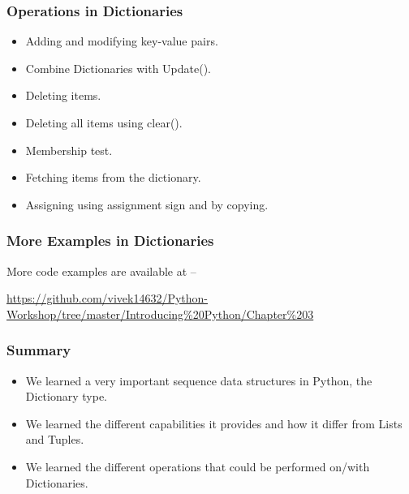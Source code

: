 \documentclass{beamer}
\begin{document}
\begin{frame}
\frametitle{Operations in Dictionaries}
\begin{itemize}
\item Adding and modifying key-value pairs.
\item Combine Dictionaries with Update().
\item Deleting items.
\item Deleting all items using clear().
\item Membership test.
\item Fetching items from the dictionary.
\item Assigning using assignment sign and by copying.
\end{itemize}
\end{frame}

\begin{frame}
\frametitle{More Examples in Dictionaries}
More code examples are available at --
 
\url{https://github.com/vivek14632/Python-Workshop/tree/master/Introducing\%20Python/Chapter\%203}
\end{frame}


\begin{frame}
\frametitle{Summary}
\begin{itemize}
\item We learned a very important sequence data structures in Python, the Dictionary type.
\item We learned the different capabilities it provides and how it differ from Lists and Tuples.
\item We learned the different operations that could be performed on/with Dictionaries.
\end{itemize}
\end{frame}
\end{document}
